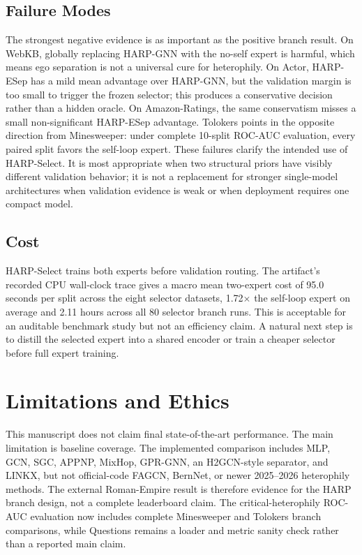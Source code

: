\documentclass[letterpaper]{article} %
\newcommand{\base}{HARP-GNN}
\newcommand{\esep}{HARP-ESep}
\newcommand{\method}{HARP-Select}
\begin{document}
\subsection{Failure Modes}

The strongest negative evidence is as important as the positive branch result.
On WebKB, globally replacing \base{} with the no-self expert is harmful, which means ego separation is not a universal cure for heterophily.
On Actor, \esep{} has a mild mean advantage over \base{}, but the validation margin is too small to trigger the frozen selector; this produces a conservative decision rather than a hidden oracle.
On Amazon-Ratings, the same conservatism misses a small non-significant \esep{} advantage.
Tolokers points in the opposite direction from Minesweeper: under complete 10-split ROC-AUC evaluation, every paired split favors the self-loop expert.
These failures clarify the intended use of \method{}.
It is most appropriate when two structural priors have visibly different validation behavior; it is not a replacement for stronger single-model architectures when validation evidence is weak or when deployment requires one compact model.

\subsection{Cost}

\method{} trains both experts before validation routing.
The artifact's recorded CPU wall-clock trace gives a macro mean two-expert cost of 95.0 seconds per split across the eight selector datasets, 1.72$\times$ the self-loop expert on average and 2.11 hours across all 80 selector branch runs.
This is acceptable for an auditable benchmark study but not an efficiency claim.
A natural next step is to distill the selected expert into a shared encoder or train a cheaper selector before full expert training.

\section{Limitations and Ethics}

This manuscript does not claim final state-of-the-art performance.
The main limitation is baseline coverage.
The implemented comparison includes MLP, GCN, SGC, APPNP, MixHop, GPR-GNN, an H2GCN-style separator, and LINKX, but not official-code FAGCN, BernNet, or newer 2025--2026 heterophily methods.
The external Roman-Empire result is therefore evidence for the HARP branch design, not a complete leaderboard claim.
The critical-heterophily ROC-AUC evaluation now includes complete Minesweeper and Tolokers branch comparisons, while Questions remains a loader and metric sanity check rather than a reported main claim.
\end{document}
